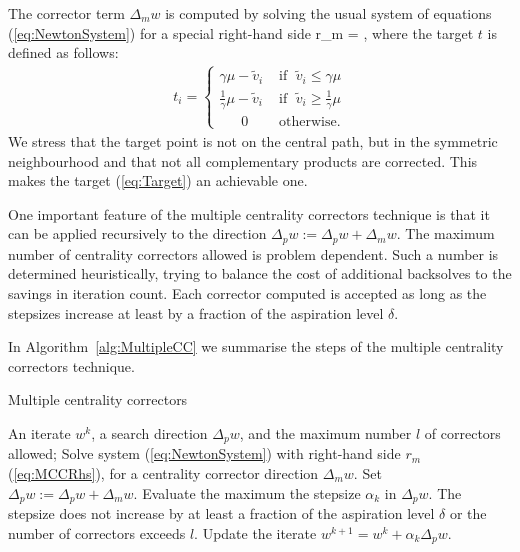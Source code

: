 The corrector term $\Delta_m w$ is computed by solving the usual 
system of equations (\ref{eq:NewtonSystem}) for a special right-hand side
\be  \label{eq:MCCRhs}
  r_m = \left[
   \begin{array}{c}
     0 \\ 0 \\ t
   \end{array} \right],
\ee
where the target $t$ is defined as follows:
%
\begin{eqnarray} \label{eq:Target}
  t_i = \left\{
  \begin{array}{ll}
    \gamma \mu - \tilde v_i 
    & \mbox{ if } \; \tilde v_i \leq \gamma \mu  \\
    \frac{1}{\gamma} \mu - \tilde v_i 
    & \mbox{ if } \; \tilde v_i \geq \frac{1}{\gamma} \mu  \\
    \quad\;\; 0    
    & \mbox{ otherwise.}
  \end{array}
  \right.
\end{eqnarray}
We stress that the target point is not on the central path, 
but in the symmetric neighbourhood and that not all complementary
products are corrected. This makes the target (\ref{eq:Target})
an achievable one.

One important feature of the multiple centrality correctors technique
is that it can be applied recursively to the direction 
$\Delta_p w := \Delta_p w + \Delta_m w$.
The maximum number of centrality correctors allowed is
problem dependent. Such a number is determined 
heuristically, trying to balance the cost of additional backsolves to 
the savings in iteration count.
Each corrector computed is accepted as long as the stepsizes increase 
at least by a fraction of the aspiration level $\delta$.


In Algorithm~\ref{alg:MultipleCC} we summarise the steps of the
multiple centrality correctors technique.
\begin{algorithm}[ht]
  \caption{Multiple centrality correctors}
    \begin{algorithmic}[0]  \label{alg:MultipleCC}
      \REQUIRE An iterate $w^k$, a search direction $\Delta_p w$,
               and the maximum number $l$ of correctors allowed;
        \smallskip
        \REPEAT
           \STATE Solve system (\ref{eq:NewtonSystem}) with right-hand side
                  $r_m$ (\ref{eq:MCCRhs}), for a centrality
                 corrector direction $\Delta_m w$.
           \smallskip
           \STATE Set $\Delta_p w := \Delta_p w + \Delta_m w$.
           \smallskip
	   \STATE Evaluate the maximum the stepsize $\alpha_k$ in $\Delta_p w$.
           \smallskip
        \UNTIL The stepsize does not increase by at least a fraction of
	       the aspiration level $\delta$ or the number of correctors 
               exceeds $l$.
        \smallskip
        \STATE Update the iterate $w^{k+1} = w^k + \alpha_k\Delta_p w$.
  \end{algorithmic}
\end{algorithm}

